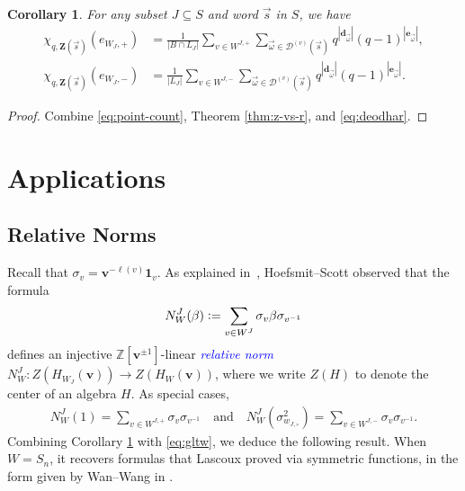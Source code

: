 \documentclass[submission]{FPSAC2025}
\newtheorem{cor}{Corollary}
\newcommand{\dfemph}[1]{\textcolor{blue}{\emph{#1}}}
\newcommand{\x}{\mathbf{v}}
\newcommand{\CharQ}[1]{\chi_{q, #1}}
\begin{document}
\begin{cor}\label{cor:r-poly}
For any subset $J \subseteq S$ and word $\vec{s}$ in $S$, we have
\begin{align}
\CharQ{\mathbf{Z}(\vec{s})}(e_{W_J, +})
	&=
		\frac{1}{|B \cap L_J|}
		\sum_{v \in W^{J, +}}
		\sum_{\vec{\omega} \in \mathcal{D}^{(v)}(\vec{s})}
			q^{|\mathbf{d}_{\vec{\omega}}|} (q - 1)^{|\mathbf{e}_{\vec{\omega}}|},\\
\CharQ{\mathbf{Z}(\vec{s})}(e_{W_J, -})
	&=
		\frac{1}{|L_J|}
		\sum_{v \in W^{J, -}}
		\sum_{\vec{\omega} \in \mathcal{D}^{(v)}(\vec{s})}
			q^{|\mathbf{d}_{\vec{\omega}}|} (q - 1)^{|\mathbf{e}_{\vec{\omega}}|}.
\end{align}
\end{cor}

\begin{proof}
Combine \eqref{eq:point-count}, Theorem \ref{thm:z-vs-r}, and \eqref{eq:deodhar}.
\end{proof}

\section{Applications}\label{sec:traces}

\subsection{Relative Norms}

Recall that $\sigma_v = \x^{-\ell(v)} \mathbf{1}_v$.
As explained in~\cite{jones-l}, Hoefsmit--Scott observed that the formula
\begin{align}
N_W^J(\beta) \vcentcolon= \sum_{v \in W^J} \sigma_v\beta \sigma_{v^{-1}}
\end{align}
defines an injective $\mathbb{Z}[\x^{\pm 1}]$-linear \dfemph{relative norm} $N_W^J : Z(H_{W_J}(\x)) \to Z(H_W(\x))$, where we write $Z(H)$ to denote the center of an algebra $H$.
As special cases,
\begin{align}\label{eq:relative-norms}
N_W^J(1)
	= \sum_{v \in W^{J, +}} \sigma_v \sigma_{v^{-1}}
	\quad\text{and}\quad
	N_W^J(\sigma_{w_{J, \circ}}^2) = \sum_{v \in W^{J, -}} \sigma_v \sigma_{v^{-1}}.
\end{align}
Combining Corollary \ref{cor:r-poly} with \eqref{eq:gltw}, we deduce the following result.
When $W = S_n$, it recovers formulas that Lascoux proved via symmetric functions, in the form given by Wan--Wang in \cite[Prop.\@ 3.8, Thm.\@ 4.1]{ww}.
\end{document}
